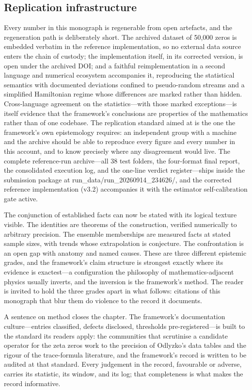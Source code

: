 \documentclass[10pt]{article}
\begin{document}
\subsection{Replication infrastructure}\label{sec:124}
Every number in this monograph is regenerable from open artefacts, and the regeneration path is deliberately short. The archived dataset of 50,000 zeros is embedded verbatim in the reference implementation, so no external data source enters the chain of custody; the implementation itself, in its corrected version, is open under the archived DOI; and a faithful reimplementation in a second language and numerical ecosystem accompanies it, reproducing the statistical semantics with documented deviations confined to pseudo-random streams and a simplified Hamiltonian regime whose differences are marked rather than hidden. Cross-language agreement on the statistics---with those marked exceptions---is itself evidence that the framework's conclusions are properties of the mathematics rather than of one codebase. The replication standard aimed at is the one the framework's own epistemology requires: an independent group with a machine and the archive should be able to reproduce every figure and every number in this account, and to know precisely where any disagreement would live. The complete reference-run archive---all 38 test folders, the four-format final report, the consolidated execution log, and the one-line verdict register---ships inside the submission package at run\_data/run\_20260914\_234626/, and the corrected reference implementation (v3.2) accompanies it with the estimator self-calibration gate active.

The conjunction of established facts can now be stated with its logical texture visible. The identities are theorems of the construction, verified numerically to arbitrary precision. The ensemble memberships are measured facts at stated sample sizes, with trends whose extrapolation is conjecture. The confrontation is an open gap with anatomy and named causes. These are three different epistemic grades, and the framework's claim structure is strongest exactly where its evidence is exactest---a configuration the philosophy of mathematics-adjacent physics usually inverts, and the inversion is the framework's method. The reader is invited to hold the three grades apart in what follows: citations of this monograph that blur them do violence to the record it documents.

A sentence on method closes the chapter. The framework's documentation culture---entries classified, defects disclosed, thresholds pre-registered---is built to the standard its readers apply: the communities that scrutinise a candidate operator for the zeta zeros work to the precision of Odlyzko's data tables and the rigour of the trace-formula literature, and the framework's record is written to be audited at that standard. Every judgement in the record, favourable or adverse, carries its statistic, its window, and its log; that completeness is what makes the record informative.
\end{document}
